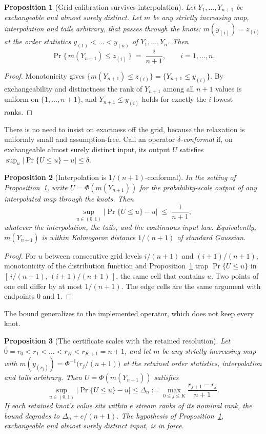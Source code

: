 \documentclass[11pt]{article}
\newtheorem{proposition}{Proposition}
\theoremstyle{remark}
\begin{document}
\begin{proposition}[Grid calibration survives interpolation]\label{prop:grid}
Let $Y_1, \dots, Y_{n+1}$ be exchangeable and almost surely distinct. Let $m$ be any
strictly increasing map, interpolation and tails arbitrary, that passes through the
knots: $m(y_{(i)}) = z_{(i)}$ at the order statistics
$y_{(1)} < \dots < y_{(n)}$ of $Y_1, \dots, Y_n$. Then
\[
  \Pr\{\, m(Y_{n+1}) \le z_{(i)} \,\} \;=\; \frac{i}{n+1},
  \qquad i = 1, \dots, n.
\]
\end{proposition}

\begin{proof}
Monotonicity gives $\{m(Y_{n+1}) \le z_{(i)}\} = \{Y_{n+1} \le y_{(i)}\}$. By
exchangeability and distinctness the rank of $Y_{n+1}$ among all $n+1$ values is uniform
on $\{1, \dots, n+1\}$, and $Y_{n+1} \le y_{(i)}$ holds for exactly the $i$ lowest
ranks.
\end{proof}

There is no need to insist on exactness off the grid, because the relaxation is
uniformly small and assumption-free. Call an operator \emph{$\delta$-conformal} if,
on exchangeable almost surely distinct input, its output $U$ satisfies
$\sup_{u} |\Pr\{U \le u\} - u| \le \delta$.

\begin{proposition}[Interpolation is $1/(n+1)$-conformal]\label{prop:delta}
In the setting of Proposition~\ref{prop:grid}, write $U = \Phi(m(Y_{n+1}))$ for the
probability-scale output of any interpolated map through the knots. Then
\[
  \sup_{u \in (0,1)} \big|\Pr\{U \le u\} - u\big| \;\le\; \frac{1}{n+1},
\]
whatever the interpolation, the tails, and the continuous input law. Equivalently,
$m(Y_{n+1})$ is within Kolmogorov distance $1/(n+1)$ of standard Gaussian.
\end{proposition}

\begin{proof}
For $u$ between consecutive grid levels $i/(n+1)$ and $(i+1)/(n+1)$, monotonicity of the
distribution function and Proposition~\ref{prop:grid} trap $\Pr\{U \le u\}$ in
$[\,i/(n+1),\, (i+1)/(n+1)\,]$, the same cell that contains $u$. Two points of one cell
differ by at most $1/(n+1)$. The edge cells are the same argument with endpoints $0$
and $1$.
\end{proof}

The bound generalizes to the implemented operator, which does not keep every knot.

\begin{proposition}[The certificate scales with the retained resolution]\label{prop:sparse}
Let $0 = r_0 < r_1 < \dots < r_K < r_{K+1} = n+1$, and let $m$ be any strictly
increasing map with $m(y_{(r_j)}) = \Phi^{-1}\big(r_j/(n+1)\big)$ at the retained
order statistics, interpolation and tails arbitrary. Then $U = \Phi(m(Y_{n+1}))$
satisfies
\[
  \sup_{u \in (0,1)} \big|\Pr\{U \le u\} - u\big| \le
  \Delta_n := \max_{0 \le j \le K} \frac{r_{j+1} - r_j}{n+1}.
\]
If each retained knot's value sits within $e$ stream ranks of its nominal rank, the
bound degrades to $\Delta_n + e/(n+1)$. The hypothesis of
Proposition~\ref{prop:grid}, exchangeable and almost surely distinct input, is in
force.
\end{proposition}
\end{document}

